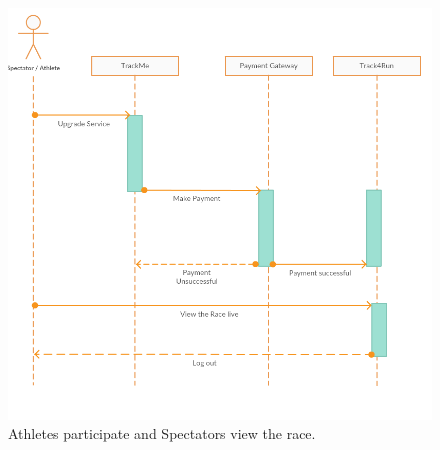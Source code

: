 \begin{figure}[H]
	\begin{center}
		\includegraphics[width=\textwidth]{./Sequence/7_AthleteSpectator.png}
      	\caption{Athletes participate and Spectators view the race.}
        \label{TrackMe_seq7}
	\end{center}
\end{figure}
